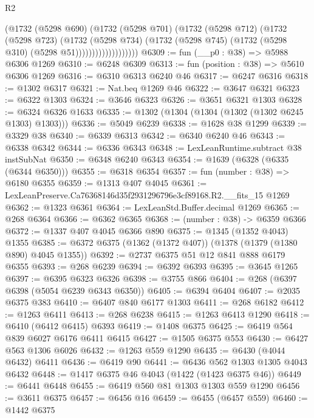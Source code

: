 \begin{lexlean}{R2}
\begin{coremodule}
                          (@1732
                            (@5298 @690)
                            (@1732
                              (@5298 @701)
                              (@1732
                                (@5298 @712)
                                (@1732
                                  (@5298 @723)
                                  (@1732
                                    (@5298 @734)
                                    (@1732
                                      (@5298 @745)
                                      (@1732 (@5298 @310) (@5298 @51)))))))))))))))))))
@6309 := fun (__p0 : @38) => @5988 @6306 @1269
@6310 := @6248 @6309
@6313 := fun (position : @38) => @5610 @6306 @1269
@6316 := @6310 @6313 @6240 @46
@6317 := @6247 @6316
@6318 := @1302 @6317
@6321 := Nat.beq @1269 @46
@6322 := @3647 @6321
@6323 := @6322 @1303
@6324 := @3646 @6323
@6326 := @3651 @6321 @1303
@6328 := @6324 @6326 @1633
@6335 := @1302 (@1304 (@1304 (@1302 (@1302 @6245 @1303) @1303)))
@6336 := @5049 @6239
@6338 := @1628 @38 @1299
@6339 := @3329 @38
@6340 := @6339 @6313
@6342 := @6340 @6240 @46
@6343 := @6338 @6342
@6344 := @6336 @6343
@6348 := LexLeanRuntime.subtract @38 instSubNat
@6350 := @6348 @6240 @6343
@6354 := @1639 (@6328 (@6335 (@6344 @6350)))
@6355 := @6318 @6354
@6357 := fun (number : @38) => @6180 @6355
@6359 := @1313 @407 @4045
@6361 := LexLeanPreserve.Ca76368146d35f2931296796e3cf89168.R2.__fits_15 @1269
@6362 := @1323 @6361
@6364 := LexLeanStd.Buffer.decimal @1269
@6365 := @268 @6364
@6366 := @6362 @6365
@6368 := (number : @38) -> @6359 @6366
@6372 := @1337 @407 @4045 @6366 @890
@6375 := @1345 (@1352 @4043) @1355
@6385 := @6372 @6375 (@1362 (@1372 @407)) (@1378 (@1379 (@1380 @890) @4045 @1355))
@6392 := @2737 @6375 @51 @12 @841 @888 @6179 @6355
@6393 := @268 @6239
@6394 := @6392 @6393
@6395 := @3645 @1265
@6397 := @6395 @6323 @6326
@6398 := @3755 @866
@6404 := @268 (@6397 @6398 (@5054 @6239 @6343 @6350))
@6405 := @6394 @6404
@6407 := @2035 @6375 @383
@6410 := @6407 @840 @6177 @1303
@6411 := @268 @6182
@6412 := @1263 @6411
@6413 := @268 @6238
@6415 := @1263 @6413 @1290
@6418 := @6410 (@6412 @6415) @6393
@6419 := @1408 @6375
@6425 := @6419 @564 @839 @6027 @6176 @6411 @6415
@6427 := @1505 @6375 @553
@6430 := @6427 @563 @1306 @6026
@6432 := @1263 @559 @1290
@6435 := @6430 (@4044 @6432) @6411
@6436 := @6419 @90
@6441 := @6436 @562 @1303 @1305 @4043 @6432
@6448 := @1417 @6375 @46 @4043 (@1422 (@1423 @6375 @46))
@6449 := @6441 @6448
@6455 := @6419 @560 @81 @1303 @1303 @559 @1290
@6456 := @3611 @6375
@6457 := @6456 @16
@6459 := @6455 (@6457 @559)
@6460 := @1442 @6375

\end{coremodule}
\end{lexlean}
